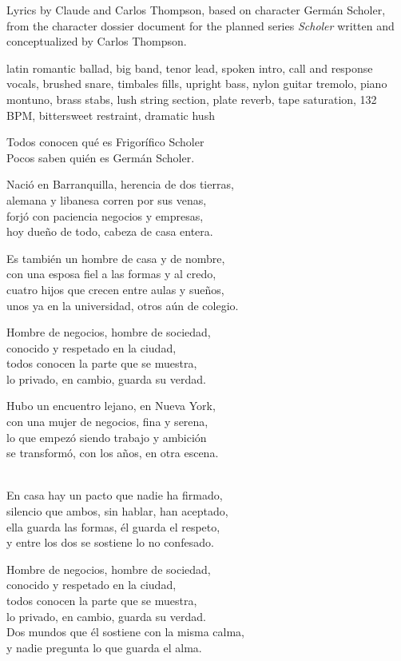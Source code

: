 
\begin{notes}
Lyrics by Claude and Carlos Thompson, based on character Germán Scholer, %
from the character dossier document for the planned series \emph{Scholer} %
written and conceptualized by Carlos Thompson.
\end{notes}
\begin{style}
latin romantic ballad, big band, tenor lead, spoken intro, call and response vocals, brushed snare, timbales fills, upright bass, nylon guitar tremolo, piano montuno, brass stabs, lush string section, plate reverb, tape saturation, 132 BPM, bittersweet restraint, dramatic hush
\end{style}
\begin{lyrics}
Todos conocen qué es Frigorífico Scholer\\
Pocos saben quién es Germán Scholer.

Nació en Barranquilla, herencia de dos tierras,\\
alemana y libanesa corren por sus venas,\\
forjó con paciencia negocios y empresas,\\
hoy dueño de todo, cabeza de casa entera.

Es también un hombre de casa y de nombre,\\
con una esposa fiel a las formas y al credo,\\
cuatro hijos que crecen entre aulas y sueños,\\
unos ya en la universidad, otros aún de colegio.

Hombre de negocios, hombre de sociedad,\\
conocido y respetado en la ciudad,\\
todos conocen la parte que se muestra,\\
lo privado, en cambio, guarda su verdad.

Hubo un encuentro lejano, en Nueva York,\\
con una mujer de negocios, fina y serena,\\
lo que empezó siendo trabajo y ambición\\
se transformó, con los años, en otra escena.

\\
En casa hay un pacto que nadie ha firmado,\\
silencio que ambos, sin hablar, han aceptado,\\
ella guarda las formas, él guarda el respeto,\\
y entre los dos se sostiene lo no confesado.

Hombre de negocios, hombre de sociedad,\\
conocido y respetado en la ciudad,\\
todos conocen la parte que se muestra,\\
lo privado, en cambio, guarda su verdad.\\
Dos mundos que él sostiene con la misma calma,\\
y nadie pregunta lo que guarda el alma.
\end{lyrics}

